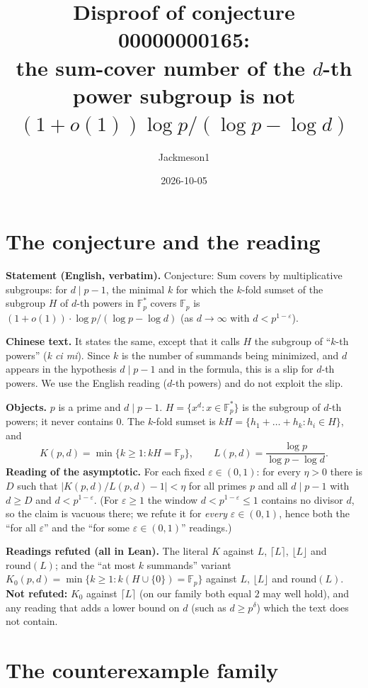 \documentclass[11pt]{article}
\title{Disproof of conjecture 00000000165:\\ the sum-cover number of the $d$-th power subgroup is not $(1+o(1))\log p/(\log p-\log d)$}
\author{Jackmeson1}
\date{2026-10-05}
\theoremstyle{definition}
\newcommand{\Fp}{\mathbb{F}_p}
\begin{document}
\maketitle

\section{The conjecture and the reading}

\textbf{Statement (English, verbatim).} Conjecture: Sum covers by multiplicative subgroups: for
$d \mid p-1$, the minimal $k$ for which the $k$-fold sumset of the subgroup $H$ of $d$-th powers in
$\Fp^{*}$ covers $\Fp$ is $(1+o(1))\cdot\log p/(\log p-\log d)$ (as $d\to\infty$ with
$d<p^{1-\varepsilon}$).

\textbf{Chinese text.} It states the same, except that it calls $H$ the subgroup of
``$k$-th powers'' (\emph{k ci mi}). Since $k$ is the number of summands being minimized, and $d$
appears in the hypothesis $d\mid p-1$ and in the formula, this is a slip for $d$-th powers. We use
the English reading ($d$-th powers) and do not exploit the slip.

\textbf{Objects.} $p$ is a prime and $d\mid p-1$. $H=\{x^d : x\in\Fp^{*}\}$ is the subgroup of
$d$-th powers; it never contains $0$. The $k$-fold sumset is
$kH=\{h_1+\dots+h_k : h_i\in H\}$, and
\[
  K(p,d)=\min\{k\ge 1 : kH=\Fp\},\qquad L(p,d)=\frac{\log p}{\log p-\log d}.
\]
\textbf{Reading of the asymptotic.} For each fixed $\varepsilon\in(0,1)$: for every $\eta>0$
there is $D$ such that $|K(p,d)/L(p,d)-1|<\eta$ for all primes $p$ and all $d\mid p-1$ with
$d\ge D$ and $d<p^{1-\varepsilon}$. (For $\varepsilon\ge 1$ the window $d<p^{1-\varepsilon}\le 1$
contains no divisor $d$, so the claim is vacuous there; we refute it for \emph{every}
$\varepsilon\in(0,1)$, hence both the ``for all $\varepsilon$'' and the ``for some
$\varepsilon\in(0,1)$'' readings.)

\textbf{Readings refuted (all in Lean).} The literal $K$ against $L$, $\lceil L\rceil$,
$\lfloor L\rfloor$ and $\mathrm{round}(L)$; and the ``at most $k$ summands'' variant
$K_0(p,d)=\min\{k\ge1: k(H\cup\{0\})=\Fp\}$ against $L$, $\lfloor L\rfloor$ and
$\mathrm{round}(L)$. \textbf{Not refuted:} $K_0$ against $\lceil L\rceil$ (on our family both
equal $2$ may well hold), and any reading that adds a lower bound on $d$ (such as
$d\ge p^{\delta}$) which the text does not contain.

\section{The counterexample family}
\end{document}
